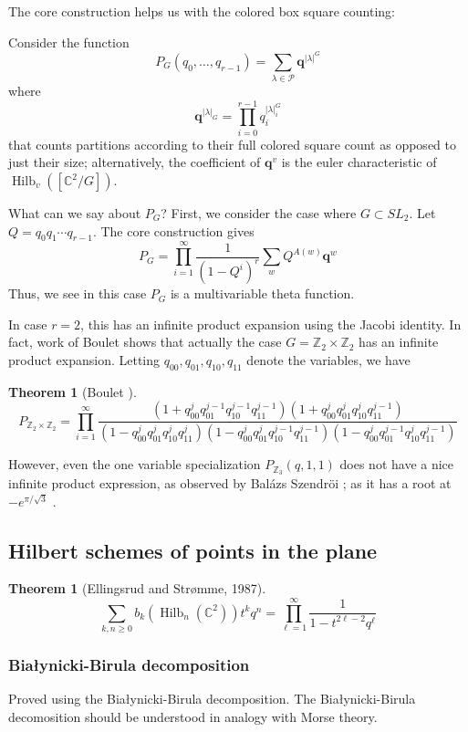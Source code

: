 \documentclass{amsart}[12pt]
\theoremstyle{definition}
\newtheorem{theorem}[dummy]{Theorem}
\newcommand{\Z}{\mathbb{Z}}
\newcommand{\C}{\mathbb{C}}
\DeclareMathOperator{\Hilb}{Hilb}
\begin{document}
The core construction helps us with the colored box square counting:

Consider the function
$$P_G(q_0,\dots,q_{r-1})=\sum_{\lambda\in\mathcal{P}} \mathbf{q}^{|\lambda|^G}$$
where 
$$\mathbf{q}^{|\lambda|_G}=\prod_{i=0}^{r-1} q_i^{|\lambda|^G_i}$$
that counts partitions according to their full colored square count as opposed to just their size; alternatively, the coefficient of $\mathbf{q}^v$ is the euler characteristic of $\Hilb_v([\C^2/G])$.

What can we say about $P_G$?  First, we consider the case where $G\subset SL_2$.  Let $Q=q_0q_1\cdots q_{r-1}$.  The core construction gives
$$P_G=\prod_{i=1}^\infty\frac{1}{(1-Q^i)^r} \sum_{w} Q^{A(w)}\mathbf{q}^w $$
Thus, we see in this case $P_G$ is a multivariable theta function.

In case $r=2$, this has an infinite product expansion using the Jacobi identity.  In fact, work of Boulet shows that actually the case $G=\Z_2\times \Z_2$ has an infinite product expansion.  Letting $q_{00}, q_{01}, q_{10}, q_{11}$ denote the variables, we have

\begin{theorem}[Boulet \cite{boulet}]
$$P_{\Z_2\times\Z_2}=\prod_{i=1}^\infty \frac{(1+q_{00}^jq_{01}^{j-1}q_{10}^{j-1}q_{11}^{j-1})(1+q_{00}^jq_{01}^jq_{10}^jq_{11}^{j-1})}{(1-q_{00}^jq_{01}^jq_{10}^jq_{11}^j)(1-q_{00}^jq_{01}^jq_{10}^{j-1}q_{11}^{j-1})(1-q_{00}^jq_{01}^{j-1}q_{10}^{j}q_{11}^{j-1})}$$
\end{theorem}

However, even the one variable specialization $P_{\Z_3}(q,1,1)$ does not have a nice infinite product expression, as observed by Bal\'azs Szendr\"oi \cite{Bmo}; as it has a root at $-e^{\pi/\sqrt{3}}$ \cite{Borwein2}.


\subsection{Hilbert schemes of points in the plane}


\begin{theorem}[Ellingsrud and Str\o mme, 1987]
$$\sum_{k,n \geq 0} b_k(\Hilb_n(\C^2))t^k q^n=\prod_{\ell=1}^\infty \frac{1}{1-t^{2\ell-2}q^\ell}$$
\end{theorem}



\subsubsection{Bia\l ynicki-Birula decomposition}
Proved using the Bia\l ynicki-Birula decomposition.  The Bia\l ynicki-Birula decomosition should be understood in analogy with Morse theory.  
\end{document}
